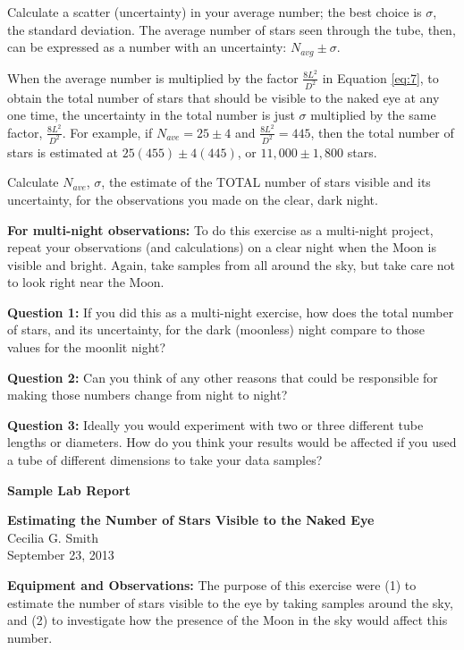 \documentclass{article}
\begin{document}
Calculate a scatter (uncertainty) in your average number; the best choice is $\sigma$, the standard deviation. The average number of stars seen through the tube, then, can be expressed as a number with an uncertainty: $N_{avg} \pm \sigma$.

When the average number is multiplied by the factor $\frac{8L^2}{D^2}$ in Equation \ref{eq:7}, to obtain the total number of stars that should be visible to the naked eye at any one time, the uncertainty in the total number is just $\sigma$ multiplied by the same factor, $\frac{8L^2}{D^2}$. For example, if $N_{ave}=25 \pm 4$ and $\frac{8L^2}{D^2}=445$, then the total number of stars is estimated at $25 (455) \pm 4 (445)$, or $11,000 \pm 1,800$ stars.

Calculate $N_{ave}$, $\sigma$, the estimate of the TOTAL number of stars visible and its uncertainty, for the observations you made on the clear, dark night. 

{\bf For multi-night observations:}  To do this exercise as a multi-night project, repeat your observations (and calculations) on a clear night when the Moon is visible and bright. Again, take samples from all around the sky, but take care not to look right near the Moon.

{\bf Question 1:} If you did this as a multi-night exercise, how does the total number of stars, and its uncertainty, for the dark (moonless) night compare to those values for the moonlit night?

\vskip 50pt

{\bf Question 2:} Can you think of any other reasons that could be responsible for making those numbers change from night to night?

\vskip 50pt

{\bf Question 3:} Ideally you would experiment with two or three different tube lengths or diameters. How do you think your results would be affected if you used a tube of different dimensions to take your data samples?


\newpage

\vphantom{fakeskip}

{\bf Sample Lab Report}

{\bf Estimating the Number of Stars Visible to the Naked Eye}\\
Cecilia G. Smith\\
September 23, 2013

{\bf Equipment and Observations:} The purpose of this exercise were (1) to estimate the number of stars visible to the eye by taking samples around the sky, and (2) to investigate how the presence of the Moon in the sky would affect this number.
\end{document}
